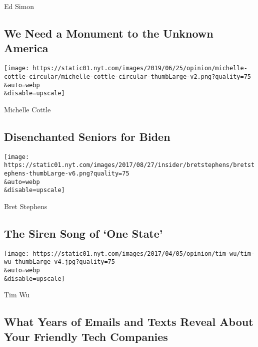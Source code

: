 \href{/2020/08/04/opinion/us-monuments-rome-unknown-god.html}{}

Ed Simon

\hypertarget{we-need-a-monument-to-the-unknown-america}{%
\subsection{We Need a Monument to the Unknown
America}\label{we-need-a-monument-to-the-unknown-america}}

\href{/2020/08/03/opinion/senior-voters-biden-trump-2020.html}{}

\texttt{[image: https://static01.nyt.com/images/2019/06/25/opinion/michelle-cottle-circular/michelle-cottle-circular-thumbLarge-v2.png?quality=75\\\&auto=webp\\\&disable=upscale]}

Michelle Cottle

\hypertarget{disenchanted-seniors-for-biden}{%
\subsection{Disenchanted Seniors for
Biden}\label{disenchanted-seniors-for-biden}}

\href{/2020/08/03/opinion/israel-palestine-one-state-solution.html}{}

\texttt{[image: https://static01.nyt.com/images/2017/08/27/insider/bretstephens/bretstephens-thumbLarge-v6.png?quality=75\\\&auto=webp\\\&disable=upscale]}

Bret Stephens

\hypertarget{the-siren-song-of-one-state}{%
\subsection{The Siren Song of `One
State'}\label{the-siren-song-of-one-state}}

\href{/2020/08/04/opinion/amazon-facebook-congressional-hearings.html}{}

\texttt{[image: https://static01.nyt.com/images/2017/04/05/opinion/tim-wu/tim-wu-thumbLarge-v4.jpg?quality=75\\\&auto=webp\\\&disable=upscale]}

Tim Wu

\hypertarget{what-years-of-emails-and-texts-reveal-about-your-friendly-tech-companies}{%
\subsection{What Years of Emails and Texts Reveal About Your Friendly
Tech
Companies}\label{what-years-of-emails-and-texts-reveal-about-your-friendly-tech-companies}}

